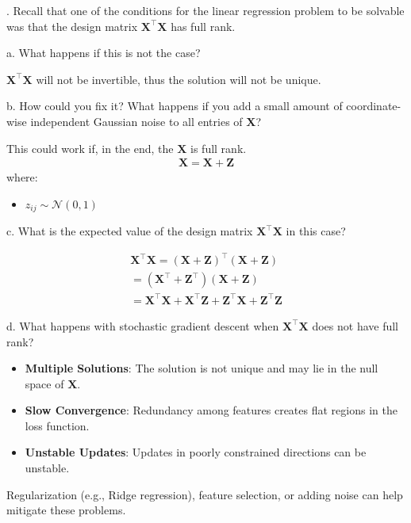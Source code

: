 \documentclass[12pt]{article}
\begin{document}
    . Recall that one of the conditions for the linear regression problem to be 
    solvable was that the design matrix \(\mathbf{X}^\top \mathbf{X}\) has full rank.

    a. What happens if this is not the case?

    \(\mathbf{X} ^ \top \mathbf{X}\) will not be invertible, thus the solution will not be 
    unique.
    
    b. How could you fix it? What happens if you add a small amount of coordinate-wise
    independent Gaussian noise to all entries of \(\mathbf{X}\)?

    This could work if, in the end, the \(\mathbf{X}\) is full rank. 
    \begin{gather*}
        \mathbf{X} = \mathbf{X} + \mathbf{Z}
    \end{gather*}
    where: 
    \begin{itemize}
        \item \(z_{ij} \sim \mathcal{N}(0, 1)\)
    \end{itemize}

    c. What is the expected value of the design matrix \(\mathbf{X} ^ \top \mathbf{X}\)
    in this case?

    \begin{gather*}
    \mathbf{X} ^ \top \mathbf{X} = (\mathbf{X} + \mathbf{Z}) ^ \top (\mathbf{X} + \mathbf{Z})\\
    = (\mathbf{X} ^ \top + \mathbf{Z} ^ \top) (\mathbf{X} + \mathbf{Z})\\
    = \mathbf{X} ^ \top \mathbf{X} + \mathbf{X} ^ \top \mathbf{Z} + \mathbf{Z} ^ \top 
    \mathbf{X} + \mathbf{Z} ^ \top \mathbf{Z}
    \end{gather*}

    d. What happens with stochastic gradient descent when \(\mathbf{X} ^ \top \mathbf{X}\)
    does not have full rank?
    \begin{itemize} 
        \item \textbf{Multiple Solutions}: The solution is not unique and may lie in the null space of \(\mathbf{X}\). 
        \item \textbf{Slow Convergence}: Redundancy among features creates flat regions in the loss function. 
        \item \textbf{Unstable Updates}: Updates in poorly constrained directions can be unstable. 
    \end{itemize}
    Regularization (e.g., Ridge regression), feature selection, or adding noise can help mitigate these problems.
\end{document}
